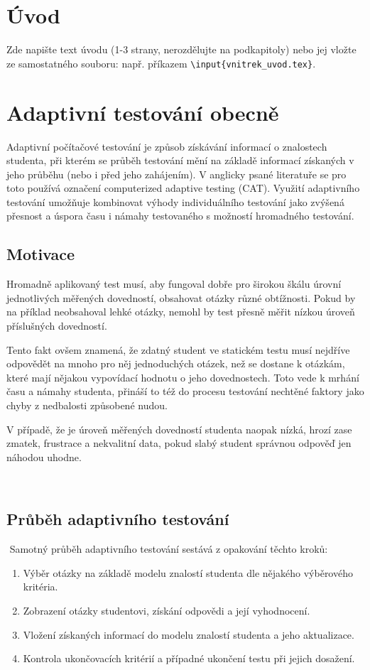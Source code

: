 \documentclass[a4paper,twoside,12pt]{book}
\begin{document}
\chapter*{Úvod} %
%
Zde napište text úvodu (1-3 strany, nerozdělujte na podkapitoly) nebo jej vložte ze samostatného souboru: např. příkazem \texttt{\textbackslash input\{vnitrek\_uvod.tex\}}.
%
%


\chapter{Adaptivní testování obecně}
Adaptivní počítačové testování je způsob získávání informací o znalostech studenta, při kterém se průběh testování mění na základě informací získaných v jeho průběhu (nebo i před jeho zahájením). V anglicky psané literatuře se pro toto používá označení computerized adaptive testing (CAT). Využití adaptivního testování umožňuje kombinovat výhody individuálního testování jako zvýšená přesnost a úspora času i námahy testovaného s možností hromadného testování.

\section{Motivace}
Hromadně aplikovaný test musí, aby fungoval dobře pro širokou škálu úrovní jednotlivých měřených dovedností, obsahovat otázky různé obtížnosti. Pokud by na příklad neobsahoval lehké otázky, nemohl by test přesně měřit nízkou úroveň příslušných dovedností.

Tento fakt ovšem znamená, že zdatný student ve statickém testu musí nejdříve odpovědět na mnoho pro něj jednoduchých otázek, než se dostane k otázkám, které mají nějakou vypovídací hodnotu o jeho dovednostech. Toto vede k mrhání času a námahy studenta, přináší to též do procesu testování nechtěné faktory jako chyby z nedbalosti způsobené nudou.

V případě, že je úroveň měřených dovedností studenta naopak nízká, hrozí zase zmatek, frustrace a nekvalitní data, pokud slabý student správnou odpověď jen náhodou uhodne. \cite[strana 10]{Wainer2000}

 \section{Průběh adaptivního testování}
 Samotný průběh adaptivního testování sestává z opakování těchto kroků:
\begin{enumerate}
	\item Výběr otázky na základě modelu znalostí studenta dle nějakého výběrového kritéria.
	\item Zobrazení otázky studentovi, získání odpovědi a její vyhodnocení.
	\item Vložení získaných informací do modelu znalostí studenta a jeho aktualizace.
	\item Kontrola ukončovacích kritérií a případné ukončení testu při jejich dosažení.
\end{enumerate}
\end{document}
